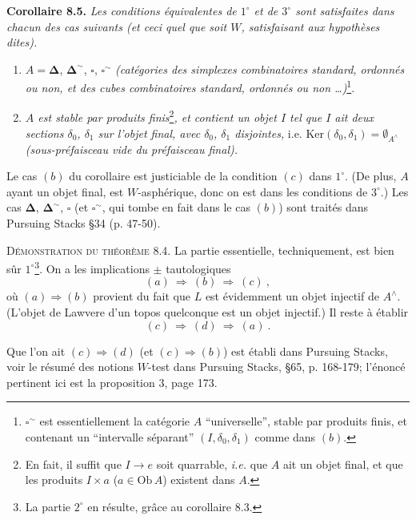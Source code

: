 \documentclass[11pt]{article}
\newcommand{\printedpage}[1]{\marginpar{\raggedright\footnotesize p.~#1}}
\newcommand{\msp}[1]{\marginpar{\raggedright\footnotesize [#1]}}
\newcommand{\Simp}{\boldsymbol{\Delta}}
\newcommand{\Cub}{\square}
\begin{document}
\textbf{Corollaire 8.5.} \textit{Les conditions équivalentes de $1^\circ$ et de $3^\circ$ sont satisfaites dans chacun des cas suivants (et ceci quel que soit $W$, satisfaisant aux hypothèses dites).}
\begin{enumerate}[leftmargin=2.5em]
\item[a)] $A = \Simp$, $\Simp^{\sim}$, $\Cub$, $\Cub^{\sim}$ \textit{(catégories des simplexes combinatoires standard, ordonnés ou non, et des cubes combinatoires standard, ordonnés ou non \ldots)}\footnote[39]{$\Cub^{\sim}$ est essentiellement la catégorie $A$ “universelle”, stable par produits finis, et contenant un “intervalle séparant” $(I,\delta_0,\delta_1)$ comme dans $(b)$.}.
\item[b)] \textit{$A$ est stable par produits finis}\footnote[40]{En fait, il suffit que $I \longrightarrow e$ soit quarrable, \textit{i.e.} que $A$ ait un objet final, et que les produits $I \times a$ ($a \in \mathrm{Ob}\,A$) existent dans $A$.}\textit{, et contient un objet $I$ tel que $I$ ait deux sections $\delta_0$, $\delta_1$ sur l'objet final, avec $\delta_0$, $\delta_1$ disjointes,} i.e. $\mathrm{Ker}(\delta_0,\delta_1) = \emptyset_{A^\wedge}$ \textit{(sous-préfaisceau vide du préfaisceau final).}
\end{enumerate}

\msp{page 108}

Le cas $(b)$ du corollaire est justiciable de la condition $(c)$ dans $1^\circ$. (De plus, $A$ ayant un objet final, est $W$-asphérique, donc on est dans les conditions de $3^\circ$.) Les cas $\Simp$, $\Simp^{\sim}$, $\Cub$ (et $\Cub^{\sim}$, qui tombe en fait dans le cas $(b)$) sont traités dans Pursuing Stacks \S34 (p. 47-50).

\textsc{Démonstration du théorème} 8.4. La partie essentielle, techniquement, est bien sûr $1^\circ$\footnote[41]{La partie $2^\circ$ en résulte, grâce au corollaire 8.3.}. On a les implications $\pm$ tautologiques
\[
(a) \ \Longrightarrow\ (b) \ \Longrightarrow\ (c)\ ,
\]
où $(a) \Longrightarrow (b)$ provient du fait que $L$ est évidemment un objet injectif de $A^\wedge$. (L'objet de Lawvere d'un topos quelconque est un objet injectif.) Il reste à établir
\[
(c) \ \Longrightarrow\ (d) \ \Longrightarrow\ (a)\ .
\]

\printedpage{60}

Que l'on ait $(c) \Longrightarrow (d)$ (et $(c) \Longrightarrow (b)$) est établi dans Pursuing Stacks, voir le résumé des notions $W$-test dans Pursuing Stacks, \S65, p. 168-179; l'énoncé pertinent ici est la proposition 3, page 173.
\end{document}
